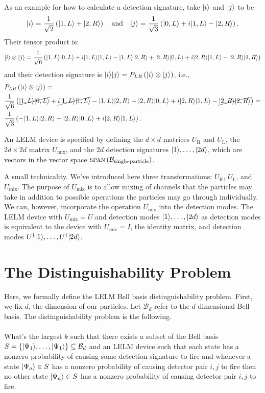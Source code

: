 As an example for how to calculate a detection signature, take $| i \rangle$ and $| j \rangle$ to be
\[
| i \rangle = \frac{1}{\sqrt{2}}\left(| 1, L \rangle + | 2, R \rangle\right) \quad \text{and} \quad | j \rangle = \frac{1}{\sqrt{3}}\left(| 0, L \rangle + i | 1, L \rangle - | 2, R \rangle\right).
\]
Their tensor product is:
\[
| i \rangle \otimes | j \rangle = \frac{1}{\sqrt{6}} \left(| 1, L \rangle| 0, L \rangle + i | 1, L \rangle| 1, L \rangle - | 1, L \rangle| 2, R \rangle + | 2, R \rangle| 0, L \rangle + i| 2, R \rangle| 1, L \rangle - | 2, R \rangle| 2, R \rangle\right)
\]
and their detection signature is $| i \rangle| j \rangle = P_{LR}\left(| i \rangle \otimes | j \rangle\right)$, i.e.,
\begin{equation}
\begin{split}
    & P_{LR}\left(| i \rangle \otimes | j \rangle\right) = \\ 
  & \frac{1}{\sqrt{6}} \left(\cancel{| 1, L \rangle| 0, L \rangle} + \cancel{i | 1, L \rangle| 1, L \rangle} - | 1, L \rangle| 2, R \rangle + | 2, R \rangle| 0, L \rangle + i| 2, R \rangle| 1, L \rangle - \cancel{| 2, R \rangle| 2, R \rangle}\right) = \\
  & \frac{1}{\sqrt{3}} \left(-| 1, L \rangle| 2, R \rangle + | 2, R \rangle| 0, L \rangle + i| 2, R \rangle| 1, L \rangle\right).
\end{split}
\end{equation}

An LELM device is specified by defining the $d\times d$ matrices $U_{\text{R}}$ and $U_{\text{L}}$, the $2d \times 2d$ matrix $U_{\text{mix}}$, and the $2d$ detection signatures $| 1 \rangle, \ldots, | 2d \rangle$, which are vectors in the vector space $\textsc{span}\left(\mathcal{B}_{\text{single-particle}}\right)$.

A small technicality. We've introduced here three transformations: $U_{\text{R}}$, $U_{\text{L}}$, and $U_\text{mix}$. The purpose of $U_\text{mix}$ is to allow mixing of channels that the particles may take in addition to possible operations the particles may go through individually. We can, however, incorporate the operation $U_\text{mix}$ into the detection modes. The LELM device with $U_\text{mix} = U$ and detection modes $| 1 \rangle, \ldots, | 2d \rangle$ as detection modes is equivalent to the device with $U_\text{mix} = I$, the identity matrix, and detection modes $U^\dagger | 1 \rangle, \ldots, U^\dagger | 2d \rangle$.

\section{The Distinguishability Problem}

Here, we formally define the LELM Bell basis distinguishability problem. First, we fix $d$, the dimension of our particles. Let $\mathcal{B}_d$ refer to the $d$-dimensional Bell basis. The distinguishability problem is the following.
\\ \\
What's the largest $k$ such that there exists a subset of the Bell basis $S = \{| \Psi_1 \rangle, \ldots, | \Psi_1 \rangle\} \subseteq \mathcal{B}_d$ and an LELM device such that each state has a nonzero probability of causing some detection signature to fire and whenever a state $| \Psi_a \rangle \in S$ has a nonzero probability of causing detector pair $i, j$ to fire then no other state $| \Psi_a \rangle \in S$ has a nonzero probability of causing detector pair $i, j$ to fire. 